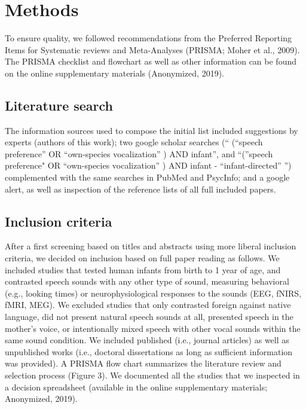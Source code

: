 \documentclass[]{apa6}
\begin{document}
\section{Methods}\label{methods}

To ensure quality, we followed recommendations from the Preferred
Reporting Items for Systematic reviews and Meta-Analyses (PRISMA; Moher
et al., 2009). The PRISMA checklist and flowchart as well as other
information can be found on the online supplementary materials
(Anonymized, 2019).

\subsection{Literature search}\label{literature-search}

The information sources used to compose the initial list included
suggestions by experts (authors of this work); two google scholar
searches (`` (\enquote{speech preference} OR \enquote{own-species
vocalization} ) AND infant'', and \enquote{(}speech preference" OR
\enquote{own-species vocalization} ) AND infant -
\enquote{infant-directed} '') complemented with the same searches in
PubMed and PsycInfo; and a google alert, as well as inspection of the
reference lists of all full included papers.

\subsection{Inclusion criteria}\label{inclusion-criteria}

After a first screening based on titles and abstracts using more liberal
inclusion criteria, we decided on inclusion based on full paper reading
as follows. We included studies that tested human infants from birth to
1 year of age, and contrasted speech sounds with any other type of
sound, measuring behavioral (e.g., looking times) or neurophysiological
responses to the sounds (EEG, fNIRS, fMRI, MEG). We excluded studies
that only contrasted foreign against native language, did not present
natural speech sounds at all, presented speech in the mother's voice, or
intentionally mixed speech with other vocal sounds within the same sound
condition. We included published (i.e., journal articles) as well as
unpublished works (i.e., doctoral dissertations as long as sufficient
information was provided). A PRISMA flow chart summarizes the literature
review and selection process (Figure 3). We documented all the studies
that we inspected in a decision spreadsheet (available in the online
supplementary materials; Anonymized, 2019).
\end{document}
